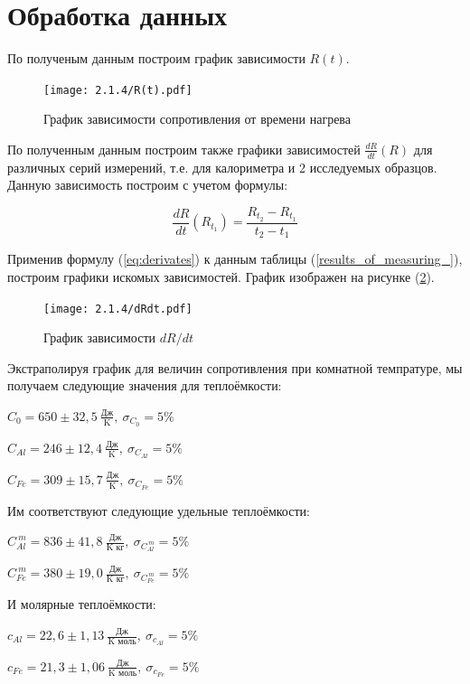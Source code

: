 \documentclass[a4paper,12pt]{article} %
\begin{document}
\section{Обработка данных}

По полученым данным построим график зависимости $R(t)$.
	
\begin{figure}[h!]
	\begin{center}
		\texttt{[image: 2.1.4/R(t).pdf]}
		\caption{График зависимости сопротивления от времени нагрева}
		\label{fig:results_of_measuring}
	\end{center}
\end{figure}

По полученным данным построим также графики зависимостей $\displaystyle \frac{dR}{dt} \left( R \right)$ для различных серий измерений, т.е. для калориметра и 2 исследуемых образцов. Данную зависимость построим с учетом формулы:

\begin{equation}
	\frac{dR}{dt} \left( R_{t_{1}} \right) = \frac{R_{t_{2}} - R_{t_{1}}}{t_{2} - t_{1}}
	\label{eq:derivates}
\end{equation}

Применив формулу (\ref{eq:derivates})  к данным таблицы (\ref{results_of_measuring_}), построим графики искомых зависимостей. График  изображен на рисунке (\ref{ris:dR_dt(r)_for_calorimetr}). 

\begin{figure}[H]
	\begin{center}
		\texttt{[image: 2.1.4/dRdt.pdf]}
		\caption{График зависимости $dR/dt$}
		\label{ris:dR_dt(r)_for_calorimetr}
	\end{center}
\end{figure}

Экстраполируя график для величин сопротивления при комнатной темпратуре, мы получаем следующие значения для теплоёмкости:
\begin{center}
$\displaystyle    C_0 = 650 \pm 32,5\ \frac{\mbox{Дж}}{\mbox{K}},\ \sigma_{C_0} = 5\%$
\break

$\displaystyle     C_{Al} = 246 \pm 12,4\  \frac{\mbox{Дж}}{\mbox{K}},\ \sigma_{C_{Al}} = 5\%$
\break

$\displaystyle     C_{Fe} = 309 \pm 15,7\  \frac{\mbox{Дж}}{\mbox{K}},\ \sigma_{C_{Fe}} = 5\%$
\break

\end{center}


Им соответствуют следующие удельные теплоёмкости:
\begin{center}

$\displaystyle     C^{\ m}_{Al} = 836 \pm 41,8\  \frac{\mbox{Дж}}{\mbox{K кг}},\ \sigma_{C^{\ m}_{Al}} = 5\%$
\break

$\displaystyle     C^{\ m}_{Fe} = 380 \pm 19,0\  \frac{\mbox{Дж}}{\mbox{K кг}},\ \sigma_{C^{\ m}_{Fe}} = 5\%$
\break

\end{center}

И молярные теплоёмкости:

\begin{center}

$\displaystyle     c_{Al} = 22,6 \pm 1,13\  \frac{\mbox{Дж}}{\mbox{K моль}},\ \sigma_{c_{Al}} = 5\%$
\break

$\displaystyle     c_{Fe} = 21,3 \pm 1,06\  \frac{\mbox{Дж}}{\mbox{K моль}},\ \sigma_{c_{Fe}} = 5\%$
\break

\end{center}
\end{document}
